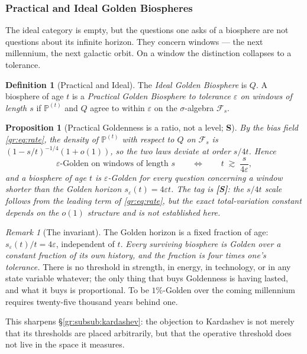 \documentclass[11pt]{article}
\numberwithin{equation}{section}
\theoremstyle{plain}
\newtheorem{proposition}[theorem]{Proposition}
\theoremstyle{definition}
\newtheorem{definition}[theorem]{Definition}
\theoremstyle{remark}
\newtheorem{remark}[theorem]{Remark}
\newcommand{\PP}{\mathbb{P}}
\begin{document}
\subsubsection{Practical and Ideal Golden Biospheres}
\label{gr:subsub:practical}

The ideal category is empty, but the questions one asks of a biosphere
are not questions about its infinite horizon. They concern windows ---
the next millennium, the next galactic orbit. On a window the
distinction collapses to a tolerance.

\begin{definition}[Practical and Ideal]\label{gr:def:practical}
The \emph{Ideal Golden Biosphere} is $Q$. A biosphere of age $t$ is a
\emph{Practical Golden Biosphere to tolerance $\varepsilon$ on windows
of length $s$} if $\PP^{(t)}$ and $Q$ agree to within $\varepsilon$ on
the $\sigma$-algebra $\mathcal F_s$.
\end{definition}

\begin{proposition}[Practical Goldenness is a ratio, not a level;
\textbf{S}]\label{gr:prop:ratio}
By the bias field \eqref{gr:eq:rate}, the density of $\PP^{(t)}$ with
respect to $Q$ on $\mathcal F_s$ is $(1-s/t)^{-1/4}(1+o(1))$, so the two
laws deviate at order $s/4t$. Hence
\begin{equation}\label{gr:eq:practical}
\text{$\varepsilon$-Golden on windows of length } s
\qquad\Longleftrightarrow\qquad
t\;\gtrsim\;\frac{s}{4\varepsilon},
\end{equation}
and a biosphere of age $t$ is $\varepsilon$-Golden for every question
concerning a window shorter than the \emph{Golden horizon}
$s_\varepsilon(t)=4\varepsilon t$. The tag is \textbf{[S]}: the $s/4t$
scale follows from the leading term of \eqref{gr:eq:rate}, but the exact
total-variation constant depends on the $o(1)$ structure and is not
established here.
\end{proposition}

\begin{remark}[The invariant]\label{gr:rem:invariant}
The Golden horizon is a fixed fraction of age:
$s_\varepsilon(t)/t=4\varepsilon$, independent of $t$. \emph{Every
surviving biosphere is Golden over a constant fraction of its own
history, and the fraction is four times one's tolerance.} There is no
threshold in strength, in energy, in technology, or in any state
variable whatever; the only thing that buys Goldenness is having lasted,
and what it buys is proportional. To be $1\%$-Golden over the coming
millennium requires twenty-five thousand years behind one.

This sharpens \S\ref{gr:subsub:kardashev}: the objection to Kardashev is
not merely that its thresholds are placed arbitrarily, but that the
operative threshold does not live in the space it measures.
\end{remark}
\end{document}
